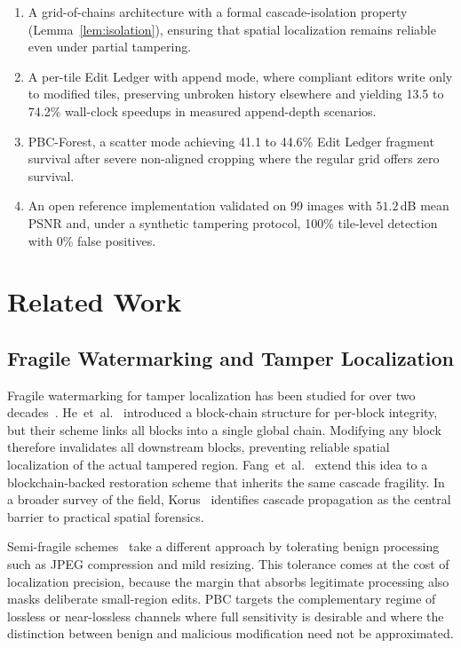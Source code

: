 \documentclass[conference]{IEEEtran}
\begin{document}
\begin{enumerate}
  \item A grid-of-chains architecture with a formal cascade-isolation
    property (Lemma~\ref{lem:isolation}), ensuring that spatial
    localization remains reliable even under partial tampering.

  \item A per-tile Edit Ledger with append mode, where compliant
    editors write only to modified tiles, preserving unbroken history
    elsewhere and yielding 13.5 to 74.2\% wall-clock speedups in
    measured append-depth scenarios.

  \item PBC-Forest, a scatter mode achieving 41.1 to 44.6\%
    Edit Ledger fragment survival after severe non-aligned cropping
    where the regular grid offers zero survival.

  \item An open reference implementation validated on 99 images with
    $51.2$\,dB mean PSNR and, under a synthetic tampering protocol, 100\% tile-level detection with
    0\% false positives.
\end{enumerate}

\section{Related Work}
\label{sec:related}

\subsection{Fragile Watermarking and Tamper Localization}

Fragile watermarking for tamper localization has been studied for over
two decades~\cite{cox2007watermarking}. He~et~al.~\cite{he2008blockchain}
introduced a block-chain structure for per-block integrity, but their
scheme links all blocks into a single global chain. Modifying any block
therefore invalidates all downstream blocks, preventing reliable spatial
localization of the actual tampered region.
Fang~et~al.~\cite{fang2020blockchain} extend this idea to a
blockchain-backed restoration scheme that inherits the same cascade
fragility. In a broader survey of the field,
Korus~\cite{korus2017survey} identifies cascade propagation as the
central barrier to practical spatial forensics.

Semi-fragile schemes~\cite{lin2001semifragile} take a different approach
by tolerating benign processing such as JPEG compression and mild
resizing. This tolerance comes at the cost of localization precision,
because the margin that absorbs legitimate processing also masks
deliberate small-region edits. PBC targets the complementary regime of
lossless or near-lossless channels where full sensitivity is desirable
and where the distinction between benign and malicious modification need
not be approximated.
\end{document}
